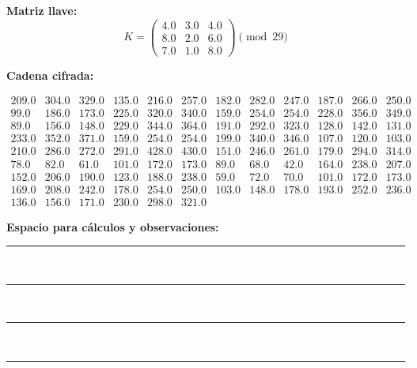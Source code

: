 \documentclass{article}%
\begin{document}
\textbf{Matriz llave:}
\[
K = \begin{pmatrix}
4.0 & 3.0 & 4.0 \\
8.0 & 2.0 & 6.0 \\
7.0 & 1.0 & 8.0
\end{pmatrix} \pmod{29}
\]

\textbf{Cadena cifrada:}
\begin{center}
$\begin{array}{lllllllllllllll}
209.0 & 304.0 & 329.0 & 135.0 & 216.0 & 257.0 & 182.0 & 282.0 & 247.0 & 187.0 & 266.0 & 250.0 \\
99.0 & 186.0 & 173.0 & 225.0 & 320.0 & 340.0 & 159.0 & 254.0 & 254.0 & 228.0 & 356.0 & 349.0 \\
89.0 & 156.0 & 148.0 & 229.0 & 344.0 & 364.0 & 191.0 & 292.0 & 323.0 & 128.0 & 142.0 & 131.0 \\
233.0 & 352.0 & 371.0 & 159.0 & 254.0 & 254.0 & 199.0 & 340.0 & 346.0 & 107.0 & 120.0 & 103.0 \\
210.0 & 286.0 & 272.0 & 291.0 & 428.0 & 430.0 & 151.0 & 246.0 & 261.0 & 179.0 & 294.0 & 314.0 \\
78.0 & 82.0 & 61.0 & 101.0 & 172.0 & 173.0 & 89.0 & 68.0 & 42.0 & 164.0 & 238.0 & 207.0 \\
152.0 & 206.0 & 190.0 & 123.0 & 188.0 & 238.0 & 59.0 & 72.0 & 70.0 & 101.0 & 172.0 & 173.0 \\
169.0 & 208.0 & 242.0 & 178.0 & 254.0 & 250.0 & 103.0 & 148.0 & 178.0 & 193.0 & 252.0 & 236.0 \\
136.0 & 156.0 & 171.0 & 230.0 & 298.0 & 321.0
\end{array}$
\end{center}

\bigskip
\textbf{Espacio para cálculos y observaciones:}\\[6pt]
\rule{\linewidth}{0.4pt}\\[10pt]
\rule{\linewidth}{0.4pt}\\[10pt]
\rule{\linewidth}{0.4pt}\\[10pt]
\rule{\linewidth}{0.4pt}\\[10pt]
%
\end{document}
